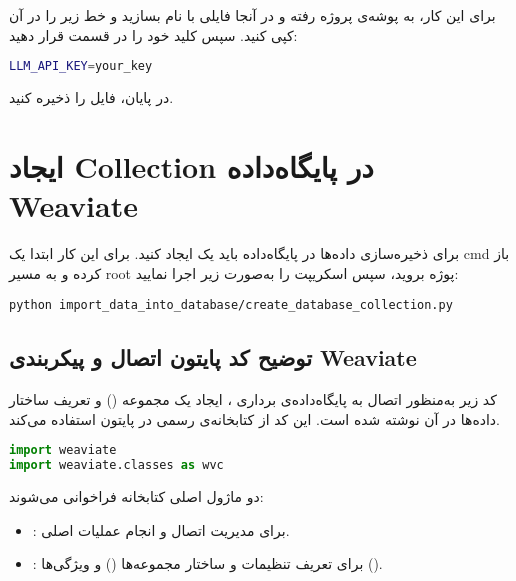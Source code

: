 \documentclass{article}
\begin{document}
برای این کار، به پوشه‌ی پروژه رفته و در آنجا فایلی با نام  بسازید و خط زیر را در آن کپی کنید. سپس کلید خود را در قسمت  قرار دهید:
\begin{latin}
\begin{lstlisting}[language=bash]
LLM_API_KEY=your_key
\end{lstlisting}
\end{latin}

در پایان، فایل را ذخیره کنید.




\section{ایجاد Collection در پایگاه‌داده Weaviate}

برای ذخیره‌سازی داده‌ها در پایگاه‌داده باید یک  ایجاد کنید.  
برای این کار ابتدا یک cmd باز کرده و به مسیر root پوژه بروید، سپس اسکریپت  را به‌صورت زیر اجرا نمایید:

\begin{latin}
\begin{lstlisting}
python import_data_into_database/create_database_collection.py
\end{lstlisting}
\end{latin}

\subsection{توضیح کد پایتون اتصال و پیکربندی Weaviate}

کد زیر به‌منظور اتصال به پایگاه‌داده‌ی برداری ، ایجاد یک مجموعه () و تعریف ساختار داده‌ها در آن نوشته شده است.  
این کد از کتابخانه‌ی رسمی  در پایتون استفاده می‌کند.

\begin{latin}
\begin{lstlisting}[language=python]
import weaviate
import weaviate.classes as wvc
\end{lstlisting}
\end{latin}

دو ماژول اصلی کتابخانه  فراخوانی می‌شوند:

\begin{itemize}
    \item {}: برای مدیریت اتصال و انجام عملیات اصلی.
    \item {}: برای تعریف تنظیمات و ساختار مجموعه‌ها () و ویژگی‌ها ().
\end{itemize}
\end{document}
